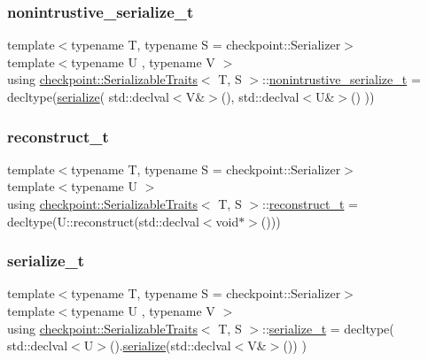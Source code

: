 \subsubsection{\texorpdfstring{nonintrustive\+\_\+serialize\+\_\+t}{nonintrustive\_serialize\_t}}
{\footnotesize\ttfamily template$<$typename T, typename S = checkpoint\+::\+Serializer$>$ \\
template$<$typename U , typename V $>$ \\
using \hyperlink{structcheckpoint_1_1_serializable_traits}{checkpoint\+::\+Serializable\+Traits}$<$ T, S $>$\+::\hyperlink{structcheckpoint_1_1_serializable_traits_a3284d2cfd29cfe429d5cf76186d3fe3c}{nonintrustive\+\_\+serialize\+\_\+t} =  decltype(\hyperlink{namespacecheckpoint_a075da4e7344cf037943362517e606c3a}{serialize}( std\+::declval$<$V\&$>$(), std\+::declval$<$U\&$>$() ))}

\mbox{\label{structcheckpoint_1_1_serializable_traits_a9f161977ecf1aed8a4ccd5d63768399a}} 
\subsubsection{\texorpdfstring{reconstruct\+\_\+t}{reconstruct\_t}}
{\footnotesize\ttfamily template$<$typename T, typename S = checkpoint\+::\+Serializer$>$ \\
template$<$typename U $>$ \\
using \hyperlink{structcheckpoint_1_1_serializable_traits}{checkpoint\+::\+Serializable\+Traits}$<$ T, S $>$\+::\hyperlink{structcheckpoint_1_1_serializable_traits_a9f161977ecf1aed8a4ccd5d63768399a}{reconstruct\+\_\+t} =  decltype(U\+::reconstruct(std\+::declval$<$void$\ast$$>$()))}

\mbox{\label{structcheckpoint_1_1_serializable_traits_a416ff19cd1038279ace5cb49e3a9fb7d}} 
\subsubsection{\texorpdfstring{serialize\+\_\+t}{serialize\_t}}
{\footnotesize\ttfamily template$<$typename T, typename S = checkpoint\+::\+Serializer$>$ \\
template$<$typename U , typename V $>$ \\
using \hyperlink{structcheckpoint_1_1_serializable_traits}{checkpoint\+::\+Serializable\+Traits}$<$ T, S $>$\+::\hyperlink{structcheckpoint_1_1_serializable_traits_a416ff19cd1038279ace5cb49e3a9fb7d}{serialize\+\_\+t} =  decltype( std\+::declval$<$U$>$().\hyperlink{namespacecheckpoint_a075da4e7344cf037943362517e606c3a}{serialize}(std\+::declval$<$V\&$>$()) )}

